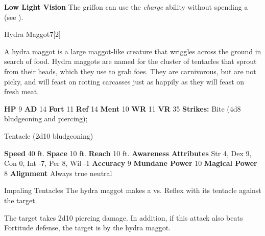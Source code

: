       
      \par \textbf{Low Light Vision}
      The griffon can use the \textit{charge} ability without spending a  (see ).
  
  \begin{monsection}{Hydra Maggot}{7}[2]
    \vspace{-1em}\vspace{-1em}
    \vspace{0em}

    
      A hydra maggot is a large maggot-like creature that wriggles across the ground in search of food.
      Hydra maggots are named for the cluster of tentacles that sprout from their heads, which they use to grab foes.
      They are carnivorous, but are not picky, and will feast on rotting carcasses just as happily as they will feast on fresh meat.
    
    

    \begin{spellcontent}
      \begin{spelltargetinginfo}
        \pari \textbf{HP} 9 \monsep
          \textbf{AD} 14 \monsep
          \textbf{Fort} 11 \monsep
          \textbf{Ref} 14 \monsep
          \textbf{Ment} 10
        \pari \textbf{WR} 11 \monsep
        \textbf{VR} 35
        \pari \textbf{Strikes:}
            Bite  (4d8 bludgeoning and piercing);
\par Tentacle  (2d10 bludgeoning)
      \end{spelltargetinginfo}
    \end{spellcontent}
    \begin{monsterfooter}
      \pari \textbf{Speed} 40 ft. \monsep
        \textbf{Space} 10 ft. \monsep
        \textbf{Reach} 10 ft.
      \pari \textbf{Awareness} 
      \pari \textbf{Attributes}
        Str 4, Dex 9,
        Con 0, Int -7,
        Per 8, Wil -1
      \pari \textbf{Accuracy} 9 \monsep
        \textbf{Mundane Power} 10 \monsep
      \textbf{Magical Power} 8
      \pari \textbf{Alignment} Always true neutral
    \end{monsterfooter}
  \end{monsection}
  \begin{freeability}{Impaling Tentacles}
       The hydra maggot makes a 
         vs. Reflex
        with its tentacle against the target.
    
    \hit 
          The target takes 2d10 piercing damage.
          In addition, if this attack also beats Fortitude defense, the target is  by the hydra maggot.
    \end{freeability}
  
